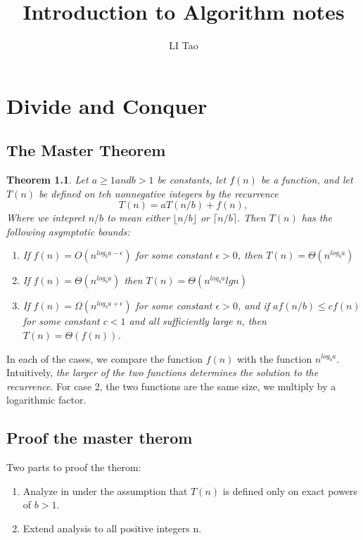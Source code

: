 \documentclass[a4paper,11pt]{book}
\author{LI Tao}
\title{Introduction to Algorithm notes}
\newtheorem{theorem}{Theorem}[chapter]
\begin{document}
\maketitle
\tableofcontents
\chapter{Divide and Conquer}
\section{The Master Theorem}
\begin{theorem}
Let $a\geq 1 and b>1$ be constants, let $f(n)$ be a function, and let $T(n)$ be defined on teh nonnegative integers by the recurrence
\[T(n) = aT(n/b)+f(n),\]
Where we intepret $n/b$ to mean either $\lfloor n/b\rfloor$ or $\lceil n/b\rceil$. Then $T(n)$ has the following asymptotic bounds:
\begin{enumerate}
\item If $f(n)=O(n^{log_b{a-\epsilon}})$ for some constant $\epsilon >0$, then $T(n) = \Theta (n^{log_ba})$
\item If $f(n)=\Theta(n^{log_ba})$ then $T(n)=\Theta(n^{log_ba} lgn)$
\item If $f(n)=\Omega(n^{log_ba+\epsilon})$ for some constant $\epsilon > 0$, and if $af(n/b) \leq cf(n)$ for some constant $c<1$ and all sufficiently large n, then $T(n)=\Theta(f(n))$. 
\end{enumerate}
\end{theorem}

In each of the cases, we compare the function $f(n)$ with the function $n^{log_ba}$. Intuitively, \emph{the larger of the two functions determines the solution to the recurrence}. For case 2, the two functions are the same size, we multiply by a logarithmic factor.
\section{Proof the master therom}
Two parts to proof the therom:
\begin{enumerate}
\item Analyze in under the assumption that $T(n)$ is defined only on exact powers of $b>1$.
\item Extend analysis to all positive integers n.
\end {enumerate}
\end{document}

